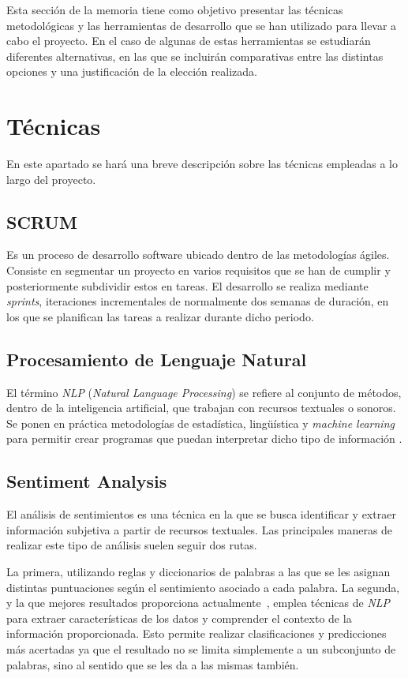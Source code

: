 
Esta sección de la memoria tiene como objetivo presentar las técnicas metodológicas y las herramientas de desarrollo que se han utilizado para llevar a cabo el proyecto. En el caso de algunas de estas herramientas se estudiarán diferentes alternativas, en las que se incluirán comparativas entre las distintas opciones y una justificación de la elección realizada.

\section{Técnicas}

En este apartado se hará una breve descripción sobre las técnicas empleadas a lo largo del proyecto.

\subsection{SCRUM}
Es un proceso de desarrollo software ubicado dentro de las metodologías ágiles. Consiste en segmentar un proyecto en varios requisitos que se han de cumplir y posteriormente subdividir estos en tareas. El desarrollo se realiza mediante \textit{sprints}, iteraciones incrementales de normalmente dos semanas de duración, en los que se planifican las tareas a realizar durante dicho periodo.

\subsection{Procesamiento de Lenguaje Natural}
El término \textit{NLP} (\textit{Natural Language Processing}) se refiere al conjunto de métodos, dentro de la inteligencia artificial, que trabajan con recursos textuales o sonoros. Se ponen en práctica metodologías de estadística, lingüística y \textit{machine learning} para permitir crear programas que puedan interpretar dicho tipo de información \cite{chowdhary2020natural}.

\subsection{Sentiment Analysis}
El análisis de sentimientos es una técnica en la que se busca identificar y extraer información subjetiva a partir de recursos textuales. Las principales maneras de realizar este tipo de análisis suelen seguir dos rutas.

La primera, utilizando reglas y diccionarios de palabras a las que se les asignan distintas puntuaciones según el sentimiento asociado a cada palabra. La segunda, y la que mejores resultados proporciona actualmente~\cite{mishev2020evaluation}, emplea técnicas de \textit{NLP} para extraer características de los datos y comprender el contexto de la información proporcionada. Esto permite realizar clasificaciones y predicciones más acertadas ya que el resultado no se limita simplemente a un subconjunto de palabras, sino al sentido que se les da a las mismas también.

